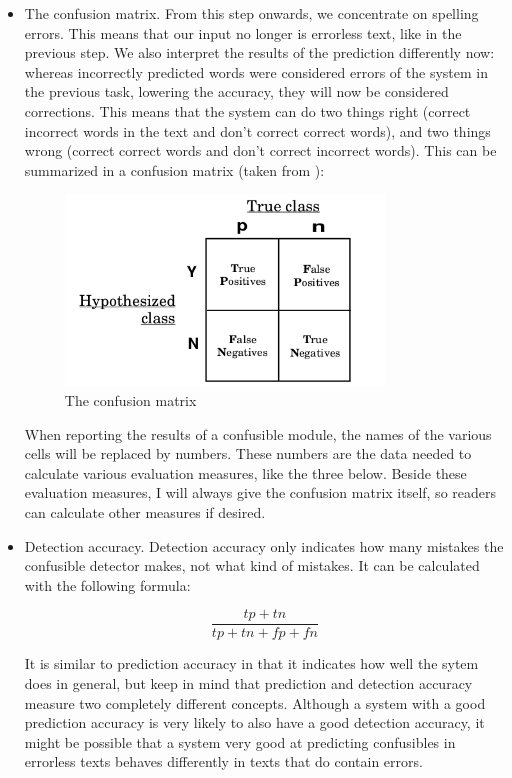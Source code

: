 \documentclass[12pt]{article}
\begin{document}
\begin{itemize}
\item The confusion matrix. From this step onwards, we concentrate on spelling errors. This means that our input no longer is errorless text, like in the previous step. We also interpret the results of the prediction differently now: whereas incorrectly predicted words were considered errors of the system in the previous task, lowering the accuracy, they will now be considered corrections. This means that the system can do two things right (correct incorrect words in the text and don't correct correct words), and two things wrong (correct correct words and don't correct incorrect words). This can be summarized in a confusion matrix (taken from \citet{fawcett04}):

\begin{figure}[htb]
\centering
\includegraphics[width=0.8\textwidth]{confusion_matrix.png}
\caption{The confusion matrix}
\label{fig:confusion}
\end{figure}

When reporting the results of a confusible module, the names of the various cells will be replaced by numbers. These numbers are the data needed to calculate various evaluation measures, like the three below. Beside these evaluation measures, I will always give the confusion matrix itself, so readers can calculate other measures if desired.

\item Detection accuracy. Detection accuracy only indicates how many mistakes the confusible detector makes, not what kind of mistakes. It can be calculated with the following formula:

\[
\frac{tp+tn}{tp+tn+fp+fn}
\]

It is similar to prediction accuracy in that it indicates how well the sytem does in general, but keep in mind that prediction and detection accuracy measure two completely different concepts. Although a system with a good prediction accuracy is very likely to also have a good detection accuracy, it might be possible that a system very good at predicting confusibles in errorless texts behaves differently in texts that do contain errors.
 

\end{itemize}
\end{document}
